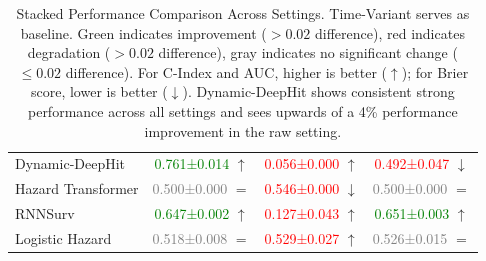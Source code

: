 \begin{table}[h!]
{\begin{tabular}{@{}l*{3}{c}@{}}
        Dynamic-DeepHit & \textcolor{green}{0.761±0.014} $\uparrow$ & \textcolor{red}{0.056±0.000} $\uparrow$ & \textcolor{red}{0.492±0.047} $\downarrow$ \\
        Hazard Transformer & \textcolor{gray}{0.500±0.000} $=$ & \textcolor{red}{0.546±0.000} $\downarrow$ & \textcolor{gray}{0.500±0.000} $=$ \\
        RNNSurv & \textcolor{green}{0.647±0.002} $\uparrow$ & \textcolor{red}{0.127±0.043} $\uparrow$ & \textcolor{green}{0.651±0.003} $\uparrow$ \\
        Logistic Hazard & \textcolor{gray}{0.518±0.008} $=$ & \textcolor{red}{0.529±0.027} $\uparrow$ & \textcolor{gray}{0.526±0.015} $=$ \\
        \bottomrule
    \end{tabular}
    }
    \caption{Stacked Performance Comparison Across Settings. Time-Variant serves as baseline. Green indicates improvement ($>0.02$ difference), red indicates degradation ($>0.02$ difference), gray indicates no significant change ($\leq 0.02$ difference). For C-Index and AUC, higher is better ($\uparrow$); for Brier score, lower is better ($\downarrow$). Dynamic-DeepHit shows consistent strong performance across all settings and sees upwards of a 4\% performance improvement in the raw setting.}
    \label{tab:stacked_performance_comparison}
\end{table}

